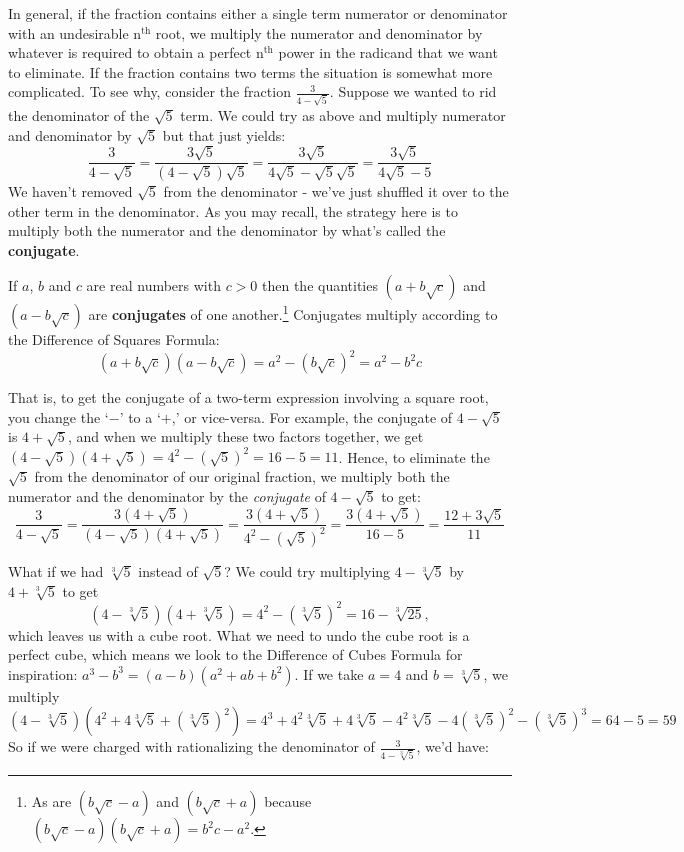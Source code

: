 In general, if the fraction contains either a single term numerator or denominator with an undesirable $\text{n}^{\text{th}}$ root, we multiply the numerator and denominator by whatever is required to obtain a perfect $\text{n}^{\text{th}}$ power in the radicand that we want to eliminate. If the fraction contains two terms the situation is somewhat more complicated.  To see why, consider the fraction $\frac{3}{4 - \sqrt{5}}$.  Suppose we wanted to rid the denominator of the $\sqrt{5}$ term.  We could try as above and multiply numerator and denominator by $\sqrt{5}$ but that just yields: \[ \dfrac{3}{4 - \sqrt{5}} = \dfrac{3\sqrt{5}}{(4 - \sqrt{5})\sqrt{5}} = \dfrac{3\sqrt{5}}{4\sqrt{5} - \sqrt{5}\sqrt{5}} = \dfrac{3\sqrt{5}}{4\sqrt{5} - 5}\] We haven't removed $\sqrt{5}$ from the denominator - we've just shuffled it over to the other term in the denominator.  As you may recall, the strategy here is to multiply both the numerator and the denominator by what's called the \textbf{conjugate}.  

\medskip

\colorbox{ResultColor}{\bbm

\begin{defn}\label{squarerootconj} 
If $a$, $b$ and $c$ are real numbers with $c > 0$ then the quantities $(a + b \sqrt{c})$ and $(a - b\sqrt{c})$ are \textbf{conjugates} of one another.\footnote{As are $(b\sqrt{c} -a)$ and $(b\sqrt{c} + a)$ because $(b\sqrt{c} -a)(b\sqrt{c} + a) = b^2c - a^2$.}  Conjugates multiply according to the Difference of Squares Formula:  \[ (a + b \sqrt{c})(a - b\sqrt{c}) = a^2 - (b \sqrt{c})^2 = a^2 - b^2c\]
\end{defn}
\ebm}

\medskip

That is, to get the conjugate of a two-term expression involving a square root, you change the `$-$' to a `$+$,' or vice-versa.  For example, the conjugate of $4 - \sqrt{5}$ is $4 + \sqrt{5}$, and when we multiply these two factors together, we get $(4 - \sqrt{5})(4 + \sqrt{5}) = 4^2 - (\sqrt{5})^2 = 16 - 5 = 11$.  Hence, to eliminate the $\sqrt{5}$ from the denominator of our original fraction, we multiply both the numerator and the denominator by the \textit{conjugate} of $4-\sqrt{5}$ to get: \[\dfrac{3}{4 - \sqrt{5}} = \dfrac{3 (4 + \sqrt{5})}{(4 - \sqrt{5})(4 + \sqrt{5})} = \dfrac{3 (4 + \sqrt{5})}{4^2 - (\sqrt{5})^2} = \dfrac{3(4 + \sqrt{5})}{16 - 5} = \dfrac{12 + 3\sqrt{5}}{11}\] 

What if we had $\sqrt[3]{5}$ instead of $\sqrt{5}$?  We could try multiplying $4 - \sqrt[3]{5}$ by $4 + \sqrt[3]{5}$ to get  \[(4 - \sqrt[3]{5})(4 + \sqrt[3]{5}) = 4^2 - (\sqrt[3]{5})^2 = 16 - \sqrt[3]{25},\] which leaves us with a cube root.  What we need to undo the cube root is a perfect cube, which means we look to the Difference of Cubes Formula for inspiration:  $a^3 - b^3 = (a-b)(a^2+ab+b^2)$.  If we take $a = 4$ and $b = \sqrt[3]{5}$, we multiply \[ (4 - \sqrt[3]{5})(4^2 + 4\sqrt[3]{5} + (\sqrt[3]{5})^2) = 4^3 + 4^2\sqrt[3]{5} + 4 \sqrt[3]{5} - 4^2\sqrt[3]{5}-4(\sqrt[3]{5})^2 - (\sqrt[3]{5})^3 = 64 - 5 = 59\] So if we were charged with rationalizing the denominator of $\frac{3}{4 - \sqrt[3]{5}}$, we'd have:

